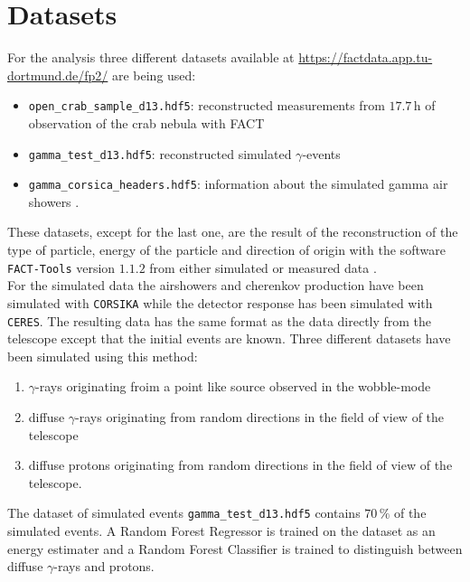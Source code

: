 \section{Datasets}
\label{sec:Durchführung}
For the analysis three different datasets available at \href{https://factdata.app.tu-dortmund.de/fp2/}{https://factdata.app.tu-dortmund.de/fp2/} are being used: 
\begin{itemize}
    \item \texttt{open\_crab\_sample\_d13.hdf5}: reconstructed measurements from $17.7 \, \text{h}$ of observation of the crab nebula with FACT
    \item \texttt{gamma\_test\_d13.hdf5}: reconstructed simulated $\gamma$-events
    \item \texttt{gamma\_corsica\_headers.hdf5}: information about the simulated gamma air showers .
\end{itemize}
These datasets, except for the last one, are the result of the reconstruction of the type of particle, energy of the particle and direction 
of origin with the software \texttt{FACT-Tools} version $1.1.2$ from either simulated or measured data \cite{FACT-tools}. \\
For the simulated data the airshowers and cherenkov production have been simulated with \texttt{CORSIKA}\cite{CORSIKA} while the detector response has been simulated with 
\texttt{CERES}. The resulting data has the same format as the data directly from the telescope except that the initial events are known. 
Three different datasets have been simulated using this method:
\begin{enumerate}
    \item $\gamma$-rays originating froim a point like source observed in the wobble-mode
    \item diffuse $\gamma$-rays originating from random directions in the field of view of the telescope
    \item diffuse protons originating from random directions in the field of view of the telescope.
\end{enumerate}
The dataset of simulated events \texttt{gamma\_test\_d13.hdf5} contains $70 \, \%$ of the simulated events.
A Random Forest Regressor is trained on the dataset as an energy estimater and a Random Forest Classifier is trained to distinguish between diffuse 
$\gamma$-rays and protons.

